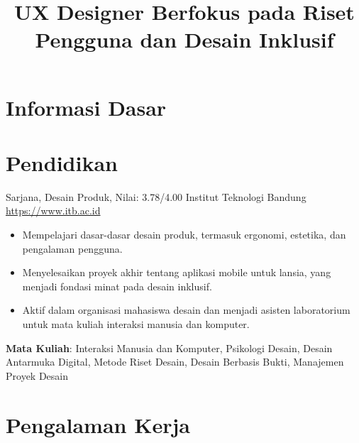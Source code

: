 \documentclass[a4paper, serif, 10pt]{moderncv}
\title{UX Designer Berfokus pada Riset Pengguna dan Desain Inklusif}
\begin{document}
\maketitle

\section{Informasi Dasar}

\section{Pendidikan}

        {Sarjana, Desain Produk, Nilai: 3.78/4.00}
        {Institut Teknologi Bandung}
        {\url{https://www.itb.ac.id}}
        {}
        {\begin{itemize}
\item Mempelajari dasar-dasar desain produk, termasuk ergonomi, estetika, dan pengalaman pengguna.
\item Menyelesaikan proyek akhir tentang aplikasi mobile untuk lansia, yang menjadi fondasi minat pada desain inklusif.
\item Aktif dalam organisasi mahasiswa desain dan menjadi asisten laboratorium untuk mata kuliah interaksi manusia dan komputer.
\end{itemize}
\textbf{Mata Kuliah}: Interaksi Manusia dan Komputer, Psikologi Desain, Desain Antarmuka Digital, Metode Riset Desain, Desain Berbasis Bukti, Manajemen Proyek Desain}
\section{Pengalaman Kerja}
\end{document}
